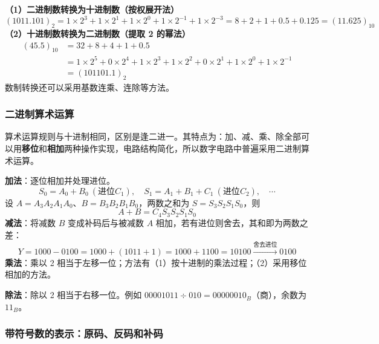 \textbf{（1）二进制数转换为十进制数（按权展开法）}
\begin{equation}
	(1011.101)_{2}=1\times2^{3}+1\times2^{1}+1\times2^{0}+1\times2^{-1}+1\times2^{-3}
	=8+2+1+0.5+0.125=(11.625)_{10}
	\label{eq:数制:二十转换}
\end{equation}
\textbf{（2）十进制数转换为二进制数（提取 2 的幂法）}
\begin{equation}
	\begin{aligned}
		(45.5)_{10} &= 32+8+4+1+0.5 \\
		&= 1\times2^{5}+0\times2^{4}+1\times2^{3}+1\times2^{2}+0\times2^{1}+1\times2^{0}+1\times2^{-1}\\
		&=(101101.1)_{2}
	\end{aligned}
	\label{eq:数制:十二转换}
\end{equation}
数制转换还可以采用基数连乘、连除等方法。

\subsubsection{二进制算术运算}

算术运算规则与十进制相同，区别是逢二进一。其特点为：加、减、乘、除全部可以用\textbf{移位}和\textbf{相加}两种操作实现，电路结构简化，所以数字电路中普遍采用二进制算术运算。

\textbf{加法}：逐位相加并处理进位。
\begin{equation}
	S_0=A_0+B_0\ (\text{进位} C_1),\quad
	S_1=A_1+B_1+C_1\ (\text{进位} C_2),\quad \cdots
	\label{eq:数制:逐位加法}
\end{equation}
设 $A=A_3A_2A_1A_0$、$B=B_3B_2B_1B_0$，两数之和为 $S=S_3S_2S_1S_0$，则
\begin{equation}
	A+B=C_4S_3S_2S_1S_0
	\label{eq:数制:加法结果}
\end{equation}
\textbf{减法}：将减数 $B$ 变成补码后与被减数 $A$ 相加，若有进位则舍去，其和即为两数之差：
\begin{equation}
	Y=1000-0100=1000+(1011+1)=1000+1100=10100
	\xrightarrow{\text{舍去进位}}0100
	\label{eq:数制:减法用补码}
\end{equation}
\textbf{乘法}：乘以 2 相当于左移一位；方法有（1）按十进制的乘法过程；（2）采用移位相加的方法。

\textbf{除法}：除以 2 相当于右移一位。例如 $00001011\div010=00000010_B$（商），余数为 $11_B$。

\subsubsection{带符号数的表示：原码、反码和补码}

